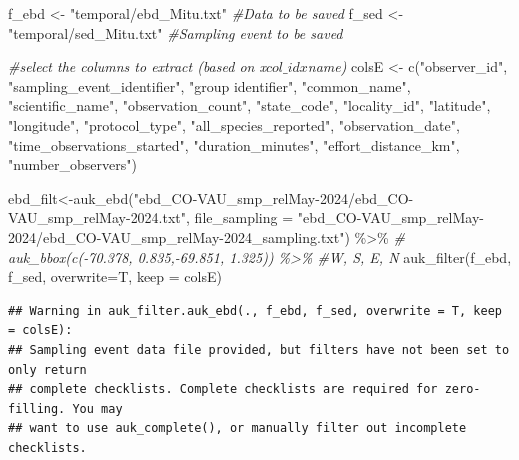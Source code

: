 \documentclass[
]{article}
\newenvironment{Shaded}{\begin{snugshade}}{\end{snugshade}}
\newcommand{\AttributeTok}[1]{\textcolor[rgb]{0.77,0.63,0.00}{#1}}
\newcommand{\CommentTok}[1]{\textcolor[rgb]{0.56,0.35,0.01}{\textit{#1}}}
\newcommand{\FunctionTok}[1]{\textcolor[rgb]{0.00,0.00,0.00}{#1}}
\newcommand{\NormalTok}[1]{#1}
\newcommand{\OtherTok}[1]{\textcolor[rgb]{0.56,0.35,0.01}{#1}}
\newcommand{\SpecialCharTok}[1]{\textcolor[rgb]{0.00,0.00,0.00}{#1}}
\newcommand{\StringTok}[1]{\textcolor[rgb]{0.31,0.60,0.02}{#1}}
\begin{document}
\begin{Shaded}
\begin{Highlighting}[]
\NormalTok{f\_ebd }\OtherTok{\textless{}{-}} \StringTok{"temporal/ebd\_Mitu.txt"}                         \CommentTok{\#Data to be saved}
\NormalTok{f\_sed }\OtherTok{\textless{}{-}} \StringTok{"temporal/sed\_Mitu.txt"}                         \CommentTok{\#Sampling event to be saved}

\CommentTok{\#select the columns to extract (based on x$col\_idx$name)}
\NormalTok{colsE }\OtherTok{\textless{}{-}} \FunctionTok{c}\NormalTok{(}\StringTok{"observer\_id"}\NormalTok{, }\StringTok{"sampling\_event\_identifier"}\NormalTok{,}
           \StringTok{"group identifier"}\NormalTok{,}
           \StringTok{"common\_name"}\NormalTok{, }\StringTok{"scientific\_name"}\NormalTok{,}
           \StringTok{"observation\_count"}\NormalTok{,}
           \StringTok{"state\_code"}\NormalTok{, }\StringTok{"locality\_id"}\NormalTok{, }\StringTok{"latitude"}\NormalTok{, }\StringTok{"longitude"}\NormalTok{,}
           \StringTok{"protocol\_type"}\NormalTok{, }\StringTok{"all\_species\_reported"}\NormalTok{,}
           \StringTok{"observation\_date"}\NormalTok{,}
           \StringTok{"time\_observations\_started"}\NormalTok{,}
           \StringTok{"duration\_minutes"}\NormalTok{, }\StringTok{"effort\_distance\_km"}\NormalTok{,}
           \StringTok{"number\_observers"}\NormalTok{)}

\NormalTok{ebd\_filt}\OtherTok{\textless{}{-}}\FunctionTok{auk\_ebd}\NormalTok{(}\StringTok{"ebd\_CO{-}VAU\_smp\_relMay{-}2024/ebd\_CO{-}VAU\_smp\_relMay{-}2024.txt"}\NormalTok{,}
                  \AttributeTok{file\_sampling =} \StringTok{"ebd\_CO{-}VAU\_smp\_relMay{-}2024/ebd\_CO{-}VAU\_smp\_relMay{-}2024\_sampling.txt"}\NormalTok{) }\SpecialCharTok{\%\textgreater{}\%}
\CommentTok{\#  auk\_bbox(c({-}70.378, 0.835,{-}69.851, 1.325)) \%\textgreater{}\% \#W, S, E, N}
  \FunctionTok{auk\_filter}\NormalTok{(f\_ebd, f\_sed, }\AttributeTok{overwrite=}\NormalTok{T, }\AttributeTok{keep =}\NormalTok{ colsE)}
\end{Highlighting}
\end{Shaded}

\begin{verbatim}
## Warning in auk_filter.auk_ebd(., f_ebd, f_sed, overwrite = T, keep = colsE):
## Sampling event data file provided, but filters have not been set to only return
## complete checklists. Complete checklists are required for zero-filling. You may
## want to use auk_complete(), or manually filter out incomplete checklists.
\end{verbatim}
\end{document}
